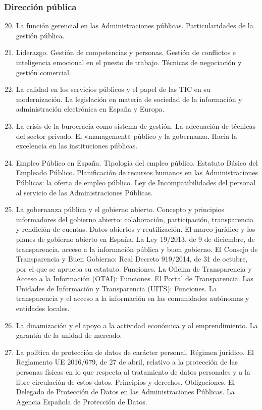 	\subsubsection{Dirección pública}
	\begin{enumerate}
		\setcounter{enumi}{19}
		\item La función gerencial en las Administraciones públicas. Particularidades de la gestión pública.
		\item Liderazgo. Gestión de competencias y personas. Gestión de conflictos e inteligencia emocional en el puesto de trabajo. Técnicas de negociación y gestión comercial.
		\item La calidad en los servicios públicos y el papel de las TIC en su modernización. La legislación en materia de sociedad de la información y administración electrónica en España y Europa.
		\item La crisis de la burocracia como sistema de gestión. La adecuación de técnicas del sector privado. El «management» público y la gobernanza. Hacia la excelencia en las instituciones públicas.
		\item Empleo Público en España. Tipología del empleo público. Estatuto Básico del Empleado Público. Planificación de recursos humanos en las Administraciones Públicas: la oferta de empleo público. Ley de Incompatibilidades del personal al servicio de las Administraciones Públicas.
		\item La gobernanza pública y el gobierno abierto. Concepto y principios informadores del gobierno abierto: colaboración, participación, transparencia y rendición de cuentas. Datos abiertos y reutilización. El marco jurídico y los planes de gobierno abierto en España. La Ley 19/2013, de 9 de diciembre, de transparencia, acceso a la información pública y buen gobierno. El Consejo de Transparencia y Buen Gobierno: Real Decreto 919/2014, de 31 de octubre, por el que se aprueba su estatuto. Funciones. La Oficina de Transparencia y Acceso a la Información (OTAI): Funciones. El Portal de Transparencia. Las Unidades de Información y Transparencia (UITS): Funciones. La transparencia y el acceso a la información en las comunidades autónomas y entidades locales.
		\item La dinamización y el apoyo a la actividad económica y al emprendimiento. La garantía de la unidad de mercado.
		\item La política de protección de datos de carácter personal. Régimen jurídico. El Reglamento UE 2016/679, de 27 de abril, relativo a la protección de las personas físicas en lo que respecta al tratamiento de datos personales y a la libre circulación de estos datos. Principios y derechos. Obligaciones. El Delegado de Protección de Datos en las Administraciones Públicas. La Agencia Española de Protección de Datos.
	\end{enumerate}
